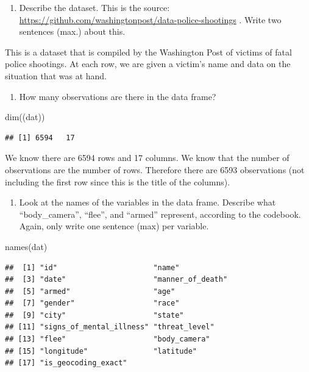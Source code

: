 \documentclass[
]{article}
\newenvironment{Shaded}{\begin{snugshade}}{\end{snugshade}}
\newcommand{\FunctionTok}[1]{\textcolor[rgb]{0.00,0.00,0.00}{#1}}
\newcommand{\NormalTok}[1]{#1}
\providecommand{\tightlist}{%
  \setlength{\itemsep}{0pt}\setlength{\parskip}{0pt}}
\begin{document}
\begin{enumerate}
\def\labelenumi{\alph{enumi}.}
\tightlist
\item
  Describe the dataset. This is the source:
  \url{https://github.com/washingtonpost/data-police-shootings} . Write
  two sentences (max.) about this.
\end{enumerate}

This is a dataset that is compiled by the Washington Post of victims of
fatal police shootings. At each row, we are given a victim's name and
data on the situation that was at hand.

\begin{enumerate}
\def\labelenumi{\alph{enumi}.}
\setcounter{enumi}{1}
\tightlist
\item
  How many observations are there in the data frame?
\end{enumerate}

\begin{Shaded}
\begin{Highlighting}[]
\FunctionTok{dim}\NormalTok{((dat))}
\end{Highlighting}
\end{Shaded}

\begin{verbatim}
## [1] 6594   17
\end{verbatim}

We know there are 6594 rows and 17 columns. We know that the number of
observations are the number of rows. Therefore there are 6593
observations (not including the first row since this is the title of the
columns).

\begin{enumerate}
\def\labelenumi{\alph{enumi}.}
\setcounter{enumi}{2}
\tightlist
\item
  Look at the names of the variables in the data frame. Describe what
  ``body\_camera'', ``flee'', and ``armed'' represent, according to the
  codebook. Again, only write one sentence (max) per variable.
\end{enumerate}

\begin{Shaded}
\begin{Highlighting}[]
\FunctionTok{names}\NormalTok{(dat)}
\end{Highlighting}
\end{Shaded}

\begin{verbatim}
##  [1] "id"                      "name"                   
##  [3] "date"                    "manner_of_death"        
##  [5] "armed"                   "age"                    
##  [7] "gender"                  "race"                   
##  [9] "city"                    "state"                  
## [11] "signs_of_mental_illness" "threat_level"           
## [13] "flee"                    "body_camera"            
## [15] "longitude"               "latitude"               
## [17] "is_geocoding_exact"
\end{verbatim}
\end{document}
